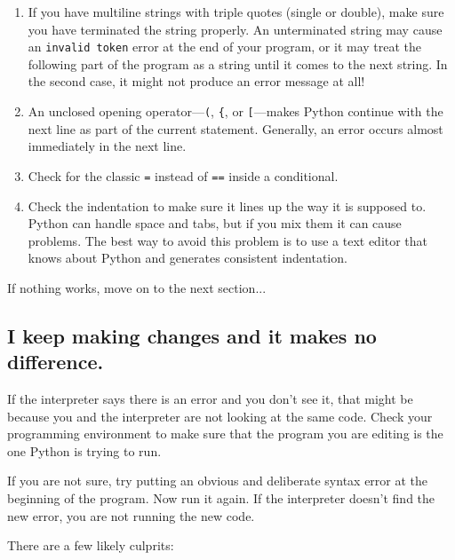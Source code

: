 \documentclass[10pt]{book}
\begin{document}
{\begin{enumerate}

\item If you have multiline strings with triple quotes (single or double), make
sure you have terminated the string properly.  An unterminated string
may cause an {\tt invalid token} error at the end of your program,
or it may treat the following part of the program as a string until it
comes to the next string.  In the second case, it might not produce an error
message at all!


\item An unclosed opening operator---\verb+(+, \verb+{+, or
  \verb+[+---makes Python continue with the next line as part of the
  current statement.  Generally, an error occurs almost immediately in
  the next line.

\item Check for the classic {\tt =} instead of {\tt ==} inside
a conditional.


\item Check the indentation to make sure it lines up the way it
is supposed to.  Python can handle space and tabs, but if you mix
them it can cause problems.  The best way to avoid this problem
is to use a text editor that knows about Python and generates
consistent indentation.


\end{enumerate}

If nothing works, move on to the next section...


\subsection{I keep making changes and it makes no difference.}

If the interpreter says there is an error and you don't see it, that
might be because you and the interpreter are not looking at the same
code.  Check your programming environment to make sure that the
program you are editing is the one Python is trying to run.

If you are not sure, try putting an obvious and deliberate syntax
error at the beginning of the program.  Now run it again.  If the
interpreter doesn't find the new error, you are not running the
new code.

There are a few likely culprits:

}
\end{document}
